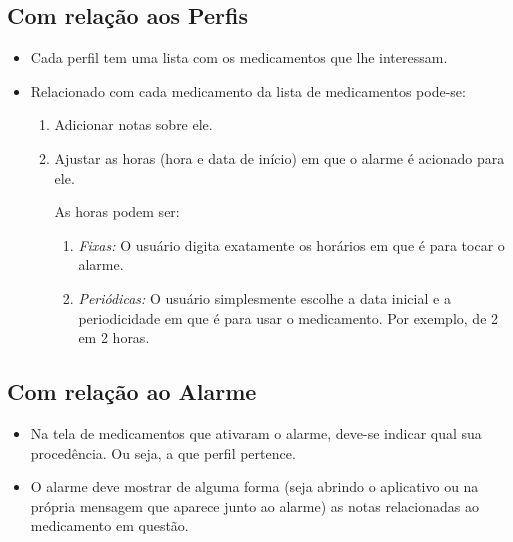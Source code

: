 \documentclass[12pt,a4paper]{article}
\begin{document}
	\subsection{Com relação aos Perfis}
		\begin{itemize}
			\item Cada perfil tem uma lista com os medicamentos que lhe interessam.
			\item Relacionado com cada medicamento da lista de medicamentos pode-se:
				\begin{enumerate}
					\item Adicionar notas sobre ele.
					\item Ajustar as horas (hora e data de início) em que o alarme é acionado para ele.
					
						As horas podem ser:
						\begin{enumerate}
							\item \emph{Fixas:} O usuário digita exatamente os horários em que é para tocar o 
											    alarme.
							\item \emph{Periódicas:} O usuário simplesmente escolhe a data inicial e a 
													 periodicidade em que é para usar o medicamento.
													 Por exemplo, de 2 em 2 horas.
						\end{enumerate}
				\end{enumerate}
		\end{itemize}
		
	\subsection{Com relação ao Alarme}
		\begin{itemize}
			\item Na tela de medicamentos que ativaram o alarme, deve-se indicar qual sua procedência. Ou seja,
				  a que perfil pertence.
			\item O alarme deve mostrar de alguma forma (seja abrindo o aplicativo ou na própria mensagem que
				  aparece junto ao alarme) as notas relacionadas ao medicamento em questão.
		\end{itemize}
		
\end{document}
